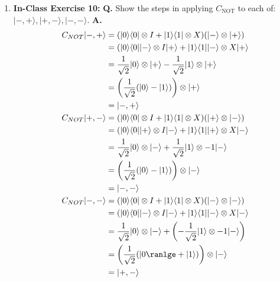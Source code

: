 \documentclass[main.tex]{subfiles}
\begin{document}
\begin{enumerate}
\item[] \textbf{In-Class Exercise 10:} \textbf{Q.} Show the steps in applying $C_{\text{NOT}}$ to each of: $|-,+\rangle,|+,-\rangle,|-,-\rangle$. \textbf{A.}
\begin{align*}
    C_{NOT}|-,+\rangle  & = (|0\rangle\langle0| \otimes I + |1\rangle\langle1| \otimes X) (|-\rangle \otimes |+\rangle)\\
                        & = (|0\rangle\langle0||-\rangle \otimes I |+\rangle + |1\rangle\langle1| |-\rangle \otimes X |+\rangle\\
                        & = \frac{1}{\sqrt{2}}|0\rangle \otimes |+\rangle - \frac{1}{\sqrt{2}} |1\rangle \otimes |+\rangle\\
                        & = \left(\frac{1}{\sqrt2}(|0\rangle-|1\rangle)\right)\otimes |+\rangle\\
                        & = |-,+\rangle \\
    C_{NOT}|+,-\rangle  & = (|0\rangle\langle0| \otimes I + |1\rangle\langle1| \otimes X) (|+\rangle \otimes |-\rangle)\\
                        & = (|0\rangle\langle0||+\rangle \otimes I |-\rangle + |1\rangle\langle1| |+\rangle \otimes X |-\rangle\\
                        & = \frac{1}{\sqrt{2}}|0\rangle \otimes |-\rangle + \frac{1}{\sqrt{2}} |1\rangle \otimes -1|-\rangle\\
                        & = \left(\frac{1}{\sqrt{2}}(|0\rangle-|1\rangle)\right) \otimes |-\rangle\\
                        & = |-,-\rangle \\
    C_{NOT}|-,-\rangle  & = (|0\rangle\langle0| \otimes I + |1\rangle\langle1| \otimes X) (|-\rangle \otimes |-\rangle)\\
                        & = (|0\rangle\langle0||-\rangle \otimes I |-\rangle + |1\rangle\langle1| |-\rangle \otimes X |-\rangle\\
                        & = \frac{1}{\sqrt{2}}|0\rangle \otimes |-\rangle + \left(-\frac{1}{\sqrt{2}} |1\rangle \otimes -1|-\rangle\right )\\
                        & = \left(\frac{1}{\sqrt{2}}(|0\ranlge + |1\rangle)\right)\otimes |-\rangle\\
                        & = |+,-\rangle
\end{align*}



\end{enumerate}
\end{document}

